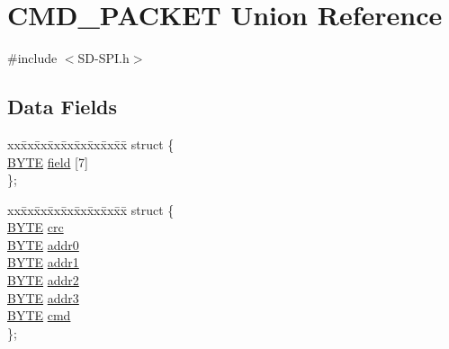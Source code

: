 \hypertarget{union_c_m_d___p_a_c_k_e_t}{}\section{C\+M\+D\+\_\+\+P\+A\+C\+K\+E\+T Union Reference}
\label{union_c_m_d___p_a_c_k_e_t}


{\ttfamily \#include $<$S\+D-\/\+S\+P\+I.\+h$>$}

\subsection*{Data Fields}
\begin{DoxyCompactItemize}
\item 
\begin{tabbing}
xx\=xx\=xx\=xx\=xx\=xx\=xx\=xx\=xx\=\kill
struct \{\\
\>\hyperlink{_generic_type_defs_8h_a4ae1dab0fb4b072a66584546209e7d58}{BYTE} \hyperlink{union_c_m_d___p_a_c_k_e_t_a7665cb13e055b8ccbcd4976534124abe}{field} \mbox{[}7\mbox{]}\\
\}; \\

\end{tabbing}\item 
\begin{tabbing}
xx\=xx\=xx\=xx\=xx\=xx\=xx\=xx\=xx\=\kill
struct \{\\
\>\hyperlink{_generic_type_defs_8h_a4ae1dab0fb4b072a66584546209e7d58}{BYTE} \hyperlink{union_c_m_d___p_a_c_k_e_t_a2260dc6bff9ae3e92606bf6c8cdb59de}{crc}\\
\>\hyperlink{_generic_type_defs_8h_a4ae1dab0fb4b072a66584546209e7d58}{BYTE} \hyperlink{union_c_m_d___p_a_c_k_e_t_ae38bd1ccf861cb1852b270379a8ef37d}{addr0}\\
\>\hyperlink{_generic_type_defs_8h_a4ae1dab0fb4b072a66584546209e7d58}{BYTE} \hyperlink{union_c_m_d___p_a_c_k_e_t_a54a1f1c0e35bb6576bb52ba552955472}{addr1}\\
\>\hyperlink{_generic_type_defs_8h_a4ae1dab0fb4b072a66584546209e7d58}{BYTE} \hyperlink{union_c_m_d___p_a_c_k_e_t_a62faa370ecb5cae05a7eb4a48b75ba21}{addr2}\\
\>\hyperlink{_generic_type_defs_8h_a4ae1dab0fb4b072a66584546209e7d58}{BYTE} \hyperlink{union_c_m_d___p_a_c_k_e_t_ab920792d1ca0b26a9c0bfa1203fe5690}{addr3}\\
\>\hyperlink{_generic_type_defs_8h_a4ae1dab0fb4b072a66584546209e7d58}{BYTE} \hyperlink{union_c_m_d___p_a_c_k_e_t_a5551481d31c4f05ff7864ab00ca62a93}{cmd}\\
\}; \\


\end{tabbing}
\end{DoxyCompactItemize}
